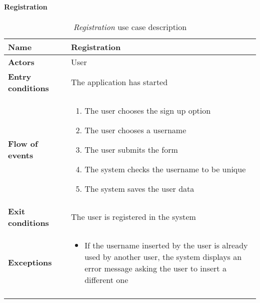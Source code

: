 		\paragraph{Registration}
		\begin{longtable}{p{0.25\linewidth}p{0.75\linewidth}}
			\toprule
			\textbf{Name} & \textbf{Registration} \\
			\midrule
			\textbf{Actors} & User \\
			\midrule
			\textbf{Entry conditions} & The application has started \\
			\midrule
			\textbf{Flow of events} & 
			\begin{enumerate}
				\item The user chooses the sign up option
				\item The user chooses a username
				\item The user submits the form
				\item The system checks the username to be unique
				\item The system saves the user data
			\end{enumerate} \\
			\midrule
			\textbf{Exit conditions} & The user is registered in the system\\
			\midrule
			\textbf{Exceptions} & 
			\begin{itemize}
				\item If the username inserted by the user is already used by another user, the system displays an error message asking the user to insert a different one
			\end{itemize} \\
			\bottomrule
			\caption{\emph{Registration} use case description}
		\end{longtable}
	
